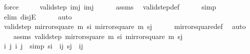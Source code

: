 \begin{isabellebody}
\ force\isanewline
\ \ \isamarkupfalse%
\ \isamarkupfalse%
\ {\isachardoublequoteopen}valid{\isacharunderscore}{\kern0pt}step\ {\isacharparenleft}{\kern0pt}i{\isacharcomma}{\kern0pt}m{\isacharminus}{\kern0pt}j{\isacharparenright}{\kern0pt}\ {\isacharparenleft}{\kern0pt}i{\isacharprime}{\kern0pt}{\isacharcomma}{\kern0pt}m{\isacharminus}{\kern0pt}j{\isacharprime}{\kern0pt}{\isacharparenright}{\kern0pt}{\isachardoublequoteclose}\isanewline
\ \ \ \ \isamarkupfalse%
\ assms\ \isamarkupfalse%
\ valid{\isacharunderscore}{\kern0pt}step{\isacharunderscore}{\kern0pt}def\isanewline
\ \ \ \ \isamarkupfalse%
\ simp\isanewline
\ \ \ \ \isamarkupfalse%
\ {\isacharparenleft}{\kern0pt}elim\ disjE{\isacharparenright}{\kern0pt}\isanewline
\ \ \ \ \isamarkupfalse%
\ auto\isanewline
\ \ \ \ \isamarkupfalse%
\isanewline
\ \ \isamarkupfalse%
\ \isamarkupfalse%
\ {\isachardoublequoteopen}valid{\isacharunderscore}{\kern0pt}step\ {\isacharparenleft}{\kern0pt}mirror{}{\isacharunderscore}{\kern0pt}square\ m\ s\isactrlsub i{\isacharparenright}{\kern0pt}\ {\isacharparenleft}{\kern0pt}mirror{}{\isacharunderscore}{\kern0pt}square\ m\ s\isactrlsub j{\isacharparenright}{\kern0pt}{\isachardoublequoteclose}\isanewline
\ \ \ \ \isamarkupfalse%
\ mirror{}{\isacharunderscore}{\kern0pt}square{\isacharunderscore}{\kern0pt}def\ \isamarkupfalse%
\ auto\isanewline
{}\isamarkupfalse%
\isanewline
\ \ \isamarkupfalse%
\ assms{\isacharcolon}{\kern0pt}\ {\isachardoublequoteopen}valid{\isacharunderscore}{\kern0pt}step\ {\isacharparenleft}{\kern0pt}mirror{}{\isacharunderscore}{\kern0pt}square\ m\ s\isactrlsub i{\isacharparenright}{\kern0pt}\ {\isacharparenleft}{\kern0pt}mirror{}{\isacharunderscore}{\kern0pt}square\ m\ s\isactrlsub j{\isacharparenright}{\kern0pt}{\isachardoublequoteclose}\isanewline
\ \ \isamarkupfalse%
\ i\ j\ i{\isacharprime}{\kern0pt}\ j{\isacharprime}{\kern0pt}\ \ {\isacharbrackleft}{\kern0pt}simp{\isacharbrackright}{\kern0pt}{\isacharcolon}{\kern0pt}\ {\isachardoublequoteopen}s\isactrlsub i\ {\isacharequal}{\kern0pt}\ {\isacharparenleft}{\kern0pt}i{\isacharcomma}{\kern0pt}j{\isacharparenright}{\kern0pt}{\isachardoublequoteclose}\ {\isachardoublequoteopen}s\isactrlsub j\ {\isacharequal}{\kern0pt}\ {\isacharparenleft}{\kern0pt}i{\isacharprime}{\kern0pt}{\isacharcomma}{\kern0pt}j{\isacharprime}{\kern0pt}{\isacharparenright}{\kern0pt}{\isachardoublequoteclose}\ \isamarkupfalse%

\end{isabellebody}
